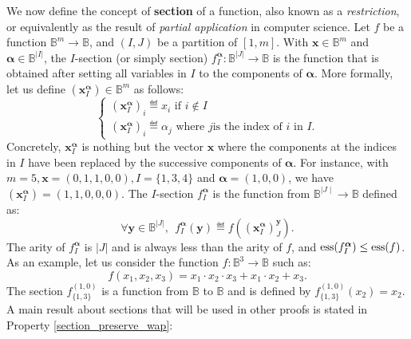 We now define the concept of \textbf{section} of a function, also known as a
\textit{restriction}, or equivalently as the result of \textit{partial
application} in computer science. Let $f$ be a function $\mathbb{B}^m\to
\mathbb{B}$, and $(I, J)$ be a partition of $[1, m]$. With $\mathbf{x} \in
\mathbb{B}^m$ and $\boldsymbol{\alpha} \in \mathbb{B}^{|I|}$, the $I$-section
(or simply section) $f^{\boldsymbol{\alpha}}_I \colon \mathbb{B}^{|J|} \to
\mathbb{B}$ is the function that is obtained after setting all variables in $I$
to the components of $\boldsymbol{\alpha}$.  More formally, let us define
$(\mathbf{x}^{\boldsymbol{\alpha}}_I) \in \mathbb{B}^m$ as follows:
$$
\begin{cases}
(\mathbf{x}^{\boldsymbol{\alpha}}_I)_i \eqdef x_i \mbox{ if } i \notin I\\
(\mathbf{x}^{\boldsymbol{\alpha}}_I)_i \eqdef \alpha_j \mbox{ where } j \mbox{
  is the index of } i \mbox{ in } I.
\end{cases}
$$
Concretely, $\mathbf{x}^{\boldsymbol{\alpha}}_I$ is nothing but the vector $\mathbf{x}$
where the components at the  indices in $I$ have been replaced by the
successive components of $\boldsymbol{\alpha}$. For instance, with $m=5,
\mathbf{x}=(0,1,1,0,0), I=\{1,3,4\}$ and $\boldsymbol{\alpha}=(1,0,0)$, we
have $(\mathbf{x}^{\boldsymbol{\alpha}}_I)=(1,1,0,0,0)$.  The $I$-section
$f^{\boldsymbol{\alpha}}_I$ is the function from $\mathbb{B}^{\mid J \mid} \to
\mathbb{B}$ defined as:
$$\forall \mathbf{y} \in \mathbb{B}^{|J|},~~
f^{\boldsymbol{\alpha}}_I(\mathbf{y}) \eqdef
f((\mathbf{x}^{\boldsymbol{\alpha}}_I)^\mathbf{y}_J).$$
The arity of $f^{\boldsymbol{\alpha}}_I$ is $|J|$ and is always less
than the arity of $f$, and 
$\operatorname{ess}(f^{\boldsymbol{\alpha}}_I) \leq \operatorname{ess}(f)$.  As an example, let us consider
the function $f\colon \mathbb{B}^3 \to \mathbb{B}$ such as:
$$f(x_1,x_2, x_3) = x_1 \cdot x_2 \cdot x_3 + x_1 \cdot x_2 + x_3.$$
The section $f^{(1, 0)}_{\{1, 3\}}$ is a function from $\mathbb{B}$ to
$\mathbb{B}$ and is defined by $f^{(1, 0)}_{\{1, 3\}}(x_2) = x_2$.
A main result about sections that will be used in other proofs is stated in
Property \ref{section_preserve_wap}:


